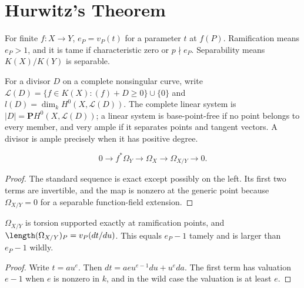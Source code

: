 \section{Hurwitz's Theorem}
\label{ha-ch4-s2}
\begin{definition}[Ramification]\label{ha-ch4-d2}
For finite \(f:X\to Y\), \(e_P=v_P(t)\) for a parameter \(t\) at \(f(P)\).
Ramification means \(e_P>1\), and it is tame if characteristic zero or
\(p\nmid e_P\).  Separability means \(K(X)/K(Y)\) is separable.
\end{definition}

\begin{definition}
\label{ha-ch4-def-divisors}
For a divisor $D$ on a complete nonsingular curve, write
$\mathcal L(D)=\{f\in K(X):(f)+D\ge0\}\cup\{0\}$ and
$l(D)=\dim_kH^0(X,\mathcal L(D))$.  The complete linear system is
$|D|=\mathbf P H^0(X,\mathcal L(D))$; a linear system is base-point-free if
no point belongs to every member, and very ample if it separates points and
tangent vectors.  A divisor is ample precisely when it has positive degree.
\end{definition}

\begin{proposition}\label{ha-ch4-p21}
\[
0\to f^*\Omega_Y\to\Omega_X\to\Omega_{X/Y}\to0.
\]
\end{proposition}
\begin{proof}
The standard sequence is exact except possibly on the left.  Its first two
terms are invertible, and the map is nonzero at the generic point because
\(\Omega_{X/Y}=0\) for a separable function-field extension.
\end{proof}

\begin{proposition}[Different]\label{ha-ch4-p22}
\(\Omega_{X/Y}\) is torsion supported exactly at ramification points, and
\(\length(\Omega_{X/Y})_P=v_P(dt/du)\).  This equals \(e_P-1\) tamely and is
larger than \(e_P-1\) wildly.
\end{proposition}
\begin{proof}
Write \(t=au^e\).  Then \(dt=aeu^{e-1}du+u^e da\).  The first term has
valuation \(e-1\) when \(e\) is nonzero in \(k\), and in the wild case the
valuation is at least \(e\).
\end{proof}

